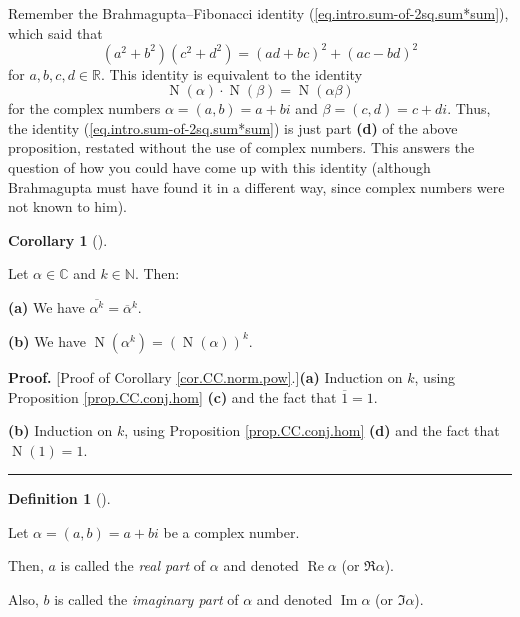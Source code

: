 \documentclass[numbers=enddot,12pt,final,onecolumn,notitlepage]{scrartcl}%
\numberwithin{exer}{subsection}
\theoremstyle{definition}
\newtheorem{defi}[theo]{Definition}
\newenvironment{definition}[1][]
{\begin{defi}[#1]\begin{leftbar}}
{\end{leftbar}\end{defi}}
\newtheorem{coro}[theo]{Corollary}
\newenvironment{corollary}[1][]
{\begin{coro}[#1]\begin{leftbar}}
{\end{leftbar}\end{coro}}
\newenvironment{proof}[1][Proof]{\noindent\textbf{#1.} }{\ \rule{0.5em}{0.5em}}
\begin{document}
Remember the Brahmagupta--Fibonacci identity
(\ref{eq.intro.sum-of-2sq.sum*sum}), which said that%
\[
\left(  a^{2}+b^{2}\right)  \left(  c^{2}+d^{2}\right)  =\left(  ad+bc\right)
^{2}+\left(  ac-bd\right)  ^{2}%
\]
for $a,b,c,d\in\mathbb{R}$. This identity is equivalent to the identity%
\[
\operatorname*{N}\left(  \alpha\right)  \cdot\operatorname*{N}\left(
\beta\right)  =\operatorname*{N}\left(  \alpha\beta\right)
\]
for the complex numbers $\alpha=\left(  a,b\right)  =a+bi$ and $\beta=\left(
c,d\right)  =c+di$. Thus, the identity (\ref{eq.intro.sum-of-2sq.sum*sum}) is
just part \textbf{(d)} of the above proposition, restated without the use of
complex numbers. This answers the question of how you could have come up with
this identity (although Brahmagupta must have found it in a different way,
since complex numbers were not known to him).

\begin{corollary}
\label{cor.CC.norm.pow}Let $\alpha\in\mathbb{C}$ and $k\in\mathbb{N}$. Then:

\textbf{(a)} We have $\overline{\alpha^{k}}=\overline{\alpha}^{k}$.

\textbf{(b)} We have $\operatorname*{N}\left(  \alpha^{k}\right)  =\left(
\operatorname*{N}\left(  \alpha\right)  \right)  ^{k}$.
\end{corollary}

\begin{proof}
[Proof of Corollary \ref{cor.CC.norm.pow}.]\textbf{(a)} Induction on $k$,
using Proposition \ref{prop.CC.conj.hom} \textbf{(c)} and the fact that
$\overline{1}=1$.

\textbf{(b)} Induction on $k$, using Proposition \ref{prop.CC.conj.hom}
\textbf{(d)} and the fact that $\operatorname*{N}\left(  1\right)  =1$.
\end{proof}

\begin{definition}
\label{def.CC.ReIm}Let $\alpha=\left(  a,b\right)  =a+bi$ be a complex number.

Then, $a$ is called the \textit{real part} of $\alpha$ and denoted
$\operatorname*{Re}\alpha$ (or $\mathfrak{R}\alpha$).

Also, $b$ is called the \textit{imaginary part} of $\alpha$ and denoted
$\operatorname*{Im}\alpha$ (or $\mathfrak{I}\alpha$).
\end{definition}
\end{document}
